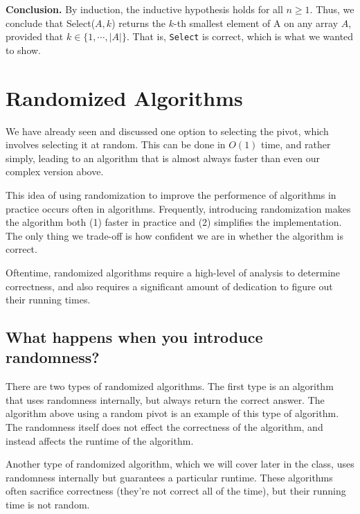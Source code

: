 \documentclass [12pt]{article}
\begin{document}
\textbf{Conclusion.} By induction, the inductive hypothesis holds for all $n \geq 1$. Thus, we conclude that Select($A, k$) returns the $k$-th smallest element of A on any array $A$, provided that $k \in \{1, \cdots , |A|\}$. That is, \texttt{Select} is correct, which is what we wanted to show.


\section{Randomized Algorithms}

We have already seen and discussed one option to selecting the pivot, which involves selecting it at random. This can be done in $O(1)$ time, and rather simply, leading to an algorithm that is almost always faster than even our complex version above.

This idea of using randomization to improve the performence of algorithms in practice occurs often in algorithms. Frequently, introducing randomization makes the algorithm both (1) faster in practice and (2) simplifies the implementation. The only thing we trade-off is how confident we are in whether the algorithm is correct.

Oftentime, randomized algorithms require a high-level of analysis to determine correctness, and also requires a significant amount of dedication to figure out their running times.

\subsection{What happens when you introduce randomness?}

There are two types of randomized algorithms. The first type is an algorithm that uses randomness internally, but always return the correct answer. The algorithm above using a random pivot is an example of this type of algorithm. The randomness itself does not effect the correctness of the algorithm, and instead affects the runtime of the algorithm.


Another type of randomized algorithm, which we will cover later in the class, uses randomness internally but guarantees a particular runtime. These algorithms often sacrifice correctness (they're not correct all of the time), but their running time is not random.
\end{document}
